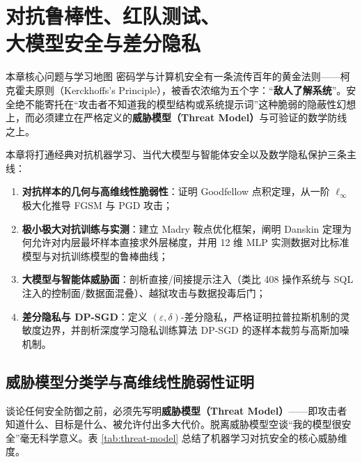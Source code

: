 \chapter[对抗鲁棒性、红队测试与大模型安全]{对抗鲁棒性、红队测试、\\大模型安全与差分隐私}\label{ch:adversarial-safety}


\begin{chapIntro}{本章核心问题与学习地图}
密码学与计算机安全有一条流传百年的黄金法则——柯克霍夫原则（Kerckhoffs's Principle），被香农浓缩为五个字：“\textbf{敌人了解系统}”。安全绝不能寄托在“攻击者不知道我的模型结构或系统提示词”这种脆弱的隐蔽性幻想上，而必须建立在严格定义的\textbf{威胁模型（Threat Model）}与可验证的数学防线之上。

本章将打通经典对抗机器学习、当代大模型与智能体安全以及数学隐私保护三条主线：
\begin{enumerate}
  \item \textbf{对抗样本的几何与高维线性脆弱性}：证明 Goodfellow 点积定理，从一阶 $\ell_\infty$ 极大化推导 FGSM 与 PGD 攻击；
  \item \textbf{极小极大对抗训练与实测}：建立 Madry 鞍点优化框架，阐明 Danskin 定理为何允许对内层最坏样本直接求外层梯度，并用 12 维 MLP 实测数据对比标准模型与对抗训练模型的鲁棒曲线；
  \item \textbf{大模型与智能体威胁面}：剖析直接/间接提示注入（类比 408 操作系统与 SQL 注入的控制面/数据面混叠）、越狱攻击与数据投毒后门；
  \item \textbf{差分隐私与 DP-SGD}：定义 $(\varepsilon,\delta)$-差分隐私，严格证明拉普拉斯机制的灵敏度边界，并剖析深度学习隐私训练算法 DP-SGD 的逐样本裁剪与高斯加噪机制。
\end{enumerate}
\end{chapIntro}

\section{威胁模型分类学与高维线性脆弱性证明}

谈论任何安全防御之前，必须先写明\textbf{威胁模型（Threat Model）}——即攻击者知道什么、目标是什么、被允许付出多大代价。脱离威胁模型空谈“我的模型很安全”毫无科学意义。表 \ref{tab:threat-model} 总结了机器学习对抗安全的核心威胁维度。

